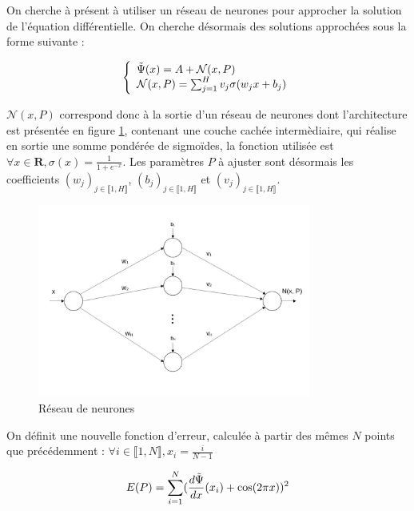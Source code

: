 \documentclass[]{article}
\begin{document}
On cherche à présent à utiliser un réseau de neurones pour approcher la solution de l'équation différentielle. On cherche désormais des solutions approchées sous la forme suivante :

\begin{equation}
\left\{
    \begin{array}{ll}
        \Tilde{\Psi}(x) = A + {\mathcal{N}}(x,P) \\
        {\mathcal{N}}(x,P) = \sum_{j=1}^{H} v_j \sigma(w_jx+b_j)
    \end{array}
\right.
\label{eq:solution NN}
\end{equation}

${\mathcal{N}}(x,P)$ correspond donc à la sortie d'un réseau de neurones dont l'architecture est présentée en figure \ref{fig:NN}, contenant une couche cachée intermèdiaire, qui réalise en sortie une somme pondérée de sigmoïdes, la fonction utilisée est $\forall x \in \mathbf{R}, \sigma(x) = \frac{1}{1+e^{-x}}$. Les paramètres $P$ à ajuster sont désormais les coefficients $(w_j)_{j\in \llbracket 1,H \rrbracket}$, $(b_j)_{j\in \llbracket 1,H \rrbracket}$ et $(v_j)_{j\in \llbracket 1,H \rrbracket}$.

\begin{figure}
\centering
\includegraphics[width=0.8\textwidth]{NN.jpg}
\caption{\label{fig:NN}Réseau de neurones}
\end{figure}

On définit une nouvelle fonction d'erreur, calculée à partir des mêmes $N$ points que précédemment : $\forall i \in\llbracket 1,N \rrbracket, x_i = \frac{i}{N-1} $

\begin{equation}
        E(P) = \sum_{i=1}^{N} (\frac{d\Tilde{\Psi}}{dx}(x_i) + \cos(2\pi x))^2
\label{eq:erreur NN}
\end{equation}
\end{document}
